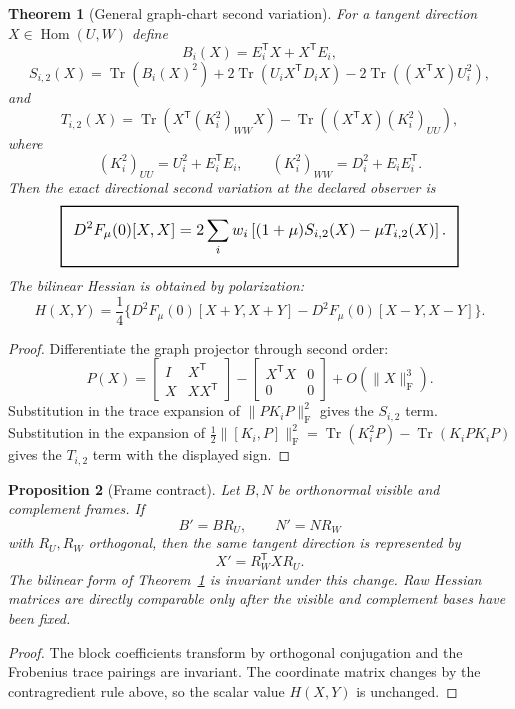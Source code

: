 \documentclass[11pt,a4paper]{article}
\numberwithin{equation}{section}
\DeclareMathOperator{\Tr}{Tr}
\DeclareMathOperator{\Hom}{Hom}
\newcommand{\Frob}{\mathrm F}
\newcommand{\geomboxed}[1]{%
  \setlength{\fboxsep}{8pt}%
  \setlength{\fboxrule}{0.9pt}%
  \fbox{\scalebox{1.12}{$\displaystyle #1$}}%
}
\theoremstyle{thmcompact}
\newtheorem{theorem}{Theorem}[section]
\newtheorem{proposition}[theorem]{Proposition}
\theoremstyle{remark}
\begin{document}
\begin{theorem}[General graph-chart second variation]
\label{thm:graph-hessian}
For a tangent direction $X\in\Hom(U,W)$ define
\[
B_i(X)=E_i^{\mathsf T}X+X^{\mathsf T}E_i,
\]
\[
S_{i,2}(X)
=
\Tr(B_i(X)^2)
+2\Tr(U_iX^{\mathsf T}D_iX)
-2\Tr((X^{\mathsf T}X)U_i^2),
\]
and
\[
T_{i,2}(X)
=
\Tr\!\left(X^{\mathsf T}(K_i^2)_{WW}X\right)
-\Tr\!\left((X^{\mathsf T}X)(K_i^2)_{UU}\right),
\]
where
\[
(K_i^2)_{UU}=U_i^2+E_i^{\mathsf T}E_i,\qquad
(K_i^2)_{WW}=D_i^2+E_iE_i^{\mathsf T}.
\]
Then the exact directional second variation at the declared observer is
\begin{equation}
\geomboxed{
D^2F_\mu(0)[X,X]
=
2\sum_i w_i
\left[(1+\mu)S_{i,2}(X)-\mu T_{i,2}(X)\right].
}
\label{eq:graph-hessian}
\end{equation}
The bilinear Hessian is obtained by polarization:
\[
H(X,Y)
=
\frac14\{D^2F_\mu(0)[X+Y,X+Y]-D^2F_\mu(0)[X-Y,X-Y]\}.
\]
\end{theorem}

\begin{proof}
Differentiate the graph projector through second order:
\[
P(X)=
\begin{bmatrix}I&X^{\mathsf T}\\ X&XX^{\mathsf T}\end{bmatrix}
-
\begin{bmatrix}X^{\mathsf T}X&0\\0&0\end{bmatrix}
+O(\|X\|_\Frob^3).
\]
Substitution in the trace expansion of $\|PK_iP\|_\Frob^2$ gives the $S_{i,2}$ term. Substitution in the expansion of $\frac12\|[K_i,P]\|_\Frob^2=\Tr(K_i^2P)-\Tr(K_iPK_iP)$ gives the $T_{i,2}$ term with the displayed sign.
\end{proof}

\begin{proposition}[Frame contract]
Let $B,N$ be orthonormal visible and complement frames. If
\[
B'=BR_U,\qquad N'=NR_W
\]
with $R_U,R_W$ orthogonal, then the same tangent direction is represented by
\[
X'=R_W^{\mathsf T}XR_U.
\]
The bilinear form of Theorem~\ref{thm:graph-hessian} is invariant under this change. Raw Hessian matrices are directly comparable only after the visible and complement bases have been fixed.
\end{proposition}

\begin{proof}
The block coefficients transform by orthogonal conjugation and the Frobenius trace pairings are invariant. The coordinate matrix changes by the contragredient rule above, so the scalar value $H(X,Y)$ is unchanged.
\end{proof}
\end{document}
